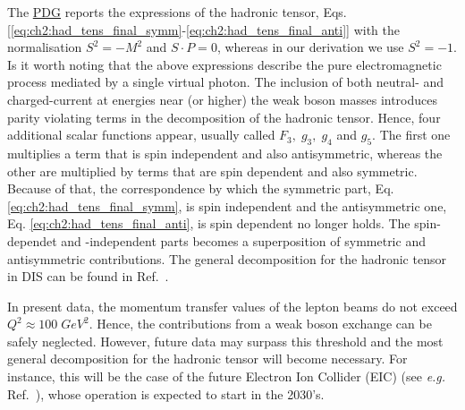 The \href{https://pdg.lbl.gov/2019/reviews/rpp2019-rev-structure-functions.pdf}{PDG} reports the expressions of the hadronic tensor, Eqs. [\ref{eq:ch2:had_tens_final_symm}-\ref{eq:ch2:had_tens_final_anti}]  with the normalisation $S^2 = - M^2$ and $S \cdot P = 0$, whereas in our derivation we use $S^2 = - 1$. Is it worth noting that the above expressions describe the pure electromagnetic process mediated by a single virtual photon. The inclusion of both neutral- and charged-current at energies near (or higher) the weak boson masses introduces parity violating terms in the decomposition of the hadronic tensor. Hence, four additional scalar functions appear, usually called $F_3, \; g_3,\; g_4$ and $g_5$. The first one multiplies a term that is spin independent and also antisymmetric, whereas the other are multiplied by terms that are spin dependent and also symmetric. Because of that, the correspondence by which the symmetric part, Eq. \eqref{eq:ch2:had_tens_final_symm}, is spin independent and the antisymmetric one, Eq. \eqref{eq:ch2:had_tens_final_anti}, is spin dependent no longer holds. The spin-dependet and -independent parts becomes a superposition of symmetric and antisymmetric contributions. The general decomposition for the hadronic tensor in DIS can be found in Ref.~\cite{Anselmino:1993tc}.\par
In present data, the momentum transfer values of the lepton beams do not exceed  $Q^2 \approx 100 \; GeV^2$. Hence, the contributions from a weak boson exchange can be safely neglected. However, future data may surpass this threshold and the most general decomposition for the hadronic tensor will become necessary. For instance, this will be the case of the future Electron Ion Collider (EIC) (see \textit{e.g.} Ref.~\cite{Borsa:2020lsz}), whose operation is expected to start in the 2030's.\par

